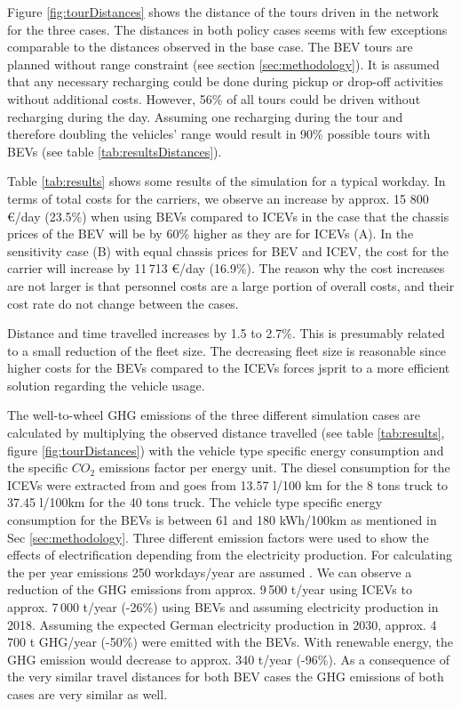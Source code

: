 Figure \ref{fig:tourDistances} shows the distance of the tours driven in the network for the three cases. The distances in both
policy cases seems with few exceptions comparable to the distances observed in the base case.
The BEV tours are planned without range constraint (see section \ref{sec:methodology}). It is assumed that any necessary recharging could be done during pickup or drop-off activities without additional costs.
However, 56\% of all tours could be driven without recharging during the day. Assuming one recharging during the tour and therefore doubling the vehicles' range would result in 90\% possible tours with BEVs (see table \ref{tab:resultsDistances}).

Table \ref{tab:results} shows some results of the simulation for a typical workday. 
In terms of total costs for the carriers, we observe an increase by approx. 15 800 \euro/day (23.5\%) when using BEVs compared to ICEVs in the case that the chassis prices of the BEV will be by 60\% higher as they are for ICEVs (A).
In the sensitivity case (B) with equal chassis prices for BEV and ICEV, the cost for the carrier will increase by 11\,713 \euro/day (16.9\%).
The reason why the cost increases are not larger is that personnel costs are a large portion of overall costs, and their cost rate do not change between the cases.

Distance and time travelled increases by 1.5 to 2.7\%.
This is presumably related to a small reduction of the fleet size.
The decreasing fleet size is reasonable since higher costs for the BEVs compared to the ICEVs forces jsprit to a more efficient solution regarding the vehicle usage.

The well-to-wheel GHG emissions of the three different simulation cases are calculated by multiplying the observed distance travelled (see table \ref{tab:results}, figure \ref{fig:tourDistances}) with the vehicle type specific energy consumption and the specific $CO_2$ emissions factor per energy unit.
The diesel consumption for the ICEVs were extracted from \cite{PlancoItpTubs2015FeBerichtBvwpMethodik} and goes from 13.57 l/100 km for the 8 tons truck to 37.45 l/100km for the 40 tons truck. 
The vehicle type specific energy consumption for the BEVs is between 61 and 180 kWh/100km as mentioned in Sec \ref{sec:methodology}.
Three different emission factors were used to show the effects of electrification depending from the electricity production.
For calculating the per year emissions 250 workdays/year are assumed \cite{PlancoItpTubs2015FeBerichtBvwpMethodik}.
We can observe a reduction of the GHG emissions from approx. 9\,500 t/year using ICEVs to approx. 7\,000 t/year (-26\%) using BEVs and assuming electricity production in 2018. Assuming the expected German electricity production in 2030, approx. 4\,700 t GHG/year (-50\%) were emitted with the BEVs. With renewable energy, the GHG emission would decrease to approx. 340 t/year (-96\%).
As a consequence of the very similar travel distances for both BEV cases the GHG emissions of both cases are very similar as well.



